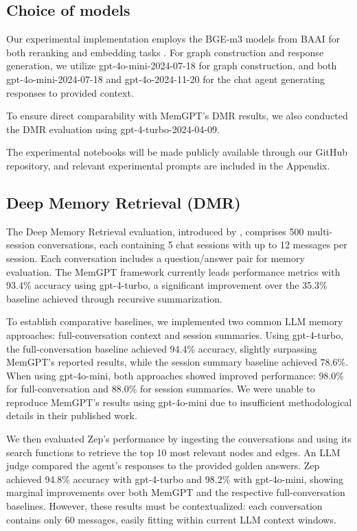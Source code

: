 \documentclass{article}
\begin{document}
\subsection{Choice of models}
Our experimental implementation employs the BGE-m3 models from BAAI for both reranking and embedding tasks \cite{li2023making} \cite{bge-m3}. For graph construction and response generation, we utilize gpt-4o-mini-2024-07-18 for graph construction, and both gpt-4o-mini-2024-07-18 and gpt-4o-2024-11-20 for the chat agent generating responses to provided context.

To ensure direct comparability with MemGPT's DMR results, we also conducted the DMR evaluation using gpt-4-turbo-2024-04-09.

The experimental notebooks will be made publicly available through our GitHub repository, and relevant experimental prompts are included in the Appendix.

\subsection{Deep Memory Retrieval (DMR)}
The Deep Memory Retrieval evaluation, introduced by \cite{memgpt}, comprises 500 multi-session conversations, each containing 5 chat sessions with up to 12 messages per session. Each conversation includes a question/answer pair for memory evaluation. The MemGPT framework \cite{memgpt} currently leads performance metrics with 93.4\% accuracy using gpt-4-turbo, a significant improvement over the 35.3\% baseline achieved through recursive summarization.

To establish comparative baselines, we implemented two common LLM memory approaches: full-conversation context and session summaries. Using gpt-4-turbo, the full-conversation baseline achieved 94.4\% accuracy, slightly surpassing MemGPT's reported results, while the session summary baseline achieved 78.6\%. When using gpt-4o-mini, both approaches showed improved performance: 98.0\% for full-conversation and 88.0\% for session summaries. We were unable to reproduce MemGPT's results using gpt-4o-mini due to insufficient methodological details in their published work.

We then evaluated Zep's performance by ingesting the conversations and using its search functions to retrieve the top 10 most relevant nodes and edges. An LLM judge compared the agent's responses to the provided golden answers. Zep achieved 94.8\% accuracy with gpt-4-turbo and 98.2\% with gpt-4o-mini, showing marginal improvements over both MemGPT and the respective full-conversation baselines. However, these results must be contextualized: each conversation contains only 60 messages, easily fitting within current LLM context windows.
\end{document}
